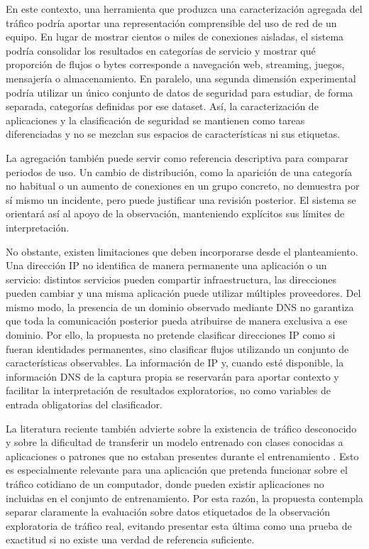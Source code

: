 \documentclass[conference]{IEEEtran}
\begin{document}
En este contexto, una herramienta que produzca una caracterización agregada del tráfico podría aportar una representación comprensible del uso de red de un equipo. En lugar de mostrar cientos o miles de conexiones aisladas, el sistema podría consolidar los resultados en categorías de servicio y mostrar qué proporción de flujos o bytes corresponde a navegación web, streaming, juegos, mensajería o almacenamiento. En paralelo, una segunda dimensión experimental podría utilizar un único conjunto de datos de seguridad para estudiar, de forma separada, categorías definidas por ese dataset. Así, la caracterización de aplicaciones y la clasificación de seguridad se mantienen como tareas diferenciadas y no se mezclan sus espacios de características ni sus etiquetas.

La agregación también puede servir como referencia descriptiva para comparar periodos de uso. Un cambio de distribución, como la aparición de una categoría no habitual o un aumento de conexiones en un grupo concreto, no demuestra por sí mismo un incidente, pero puede justificar una revisión posterior. El sistema se orientará así al apoyo de la observación, manteniendo explícitos sus límites de interpretación.

No obstante, existen limitaciones que deben incorporarse desde el planteamiento. Una dirección IP no identifica de manera permanente una aplicación o un servicio: distintos servicios pueden compartir infraestructura, las direcciones pueden cambiar y una misma aplicación puede utilizar múltiples proveedores. Del mismo modo, la presencia de un dominio observado mediante DNS no garantiza que toda la comunicación posterior pueda atribuirse de manera exclusiva a ese dominio. Por ello, la propuesta no pretende clasificar direcciones IP como si fueran identidades permanentes, sino clasificar flujos utilizando un conjunto de características observables. La información de IP y, cuando esté disponible, la información DNS de la captura propia se reservarán para aportar contexto y facilitar la interpretación de resultados exploratorios, no como variables de entrada obligatorias del clasificador.

La literatura reciente también advierte sobre la existencia de tráfico desconocido y sobre la dificultad de transferir un modelo entrenado con clases conocidas a aplicaciones o patrones que no estaban presentes durante el entrenamiento \cite{liang2024,pathmaperuma2022}. Esto es especialmente relevante para una aplicación que pretenda funcionar sobre el tráfico cotidiano de un computador, donde pueden existir aplicaciones no incluidas en el conjunto de entrenamiento. Por esta razón, la propuesta contempla separar claramente la evaluación sobre datos etiquetados de la observación exploratoria de tráfico real, evitando presentar esta última como una prueba de exactitud si no existe una verdad de referencia suficiente.
\end{document}
